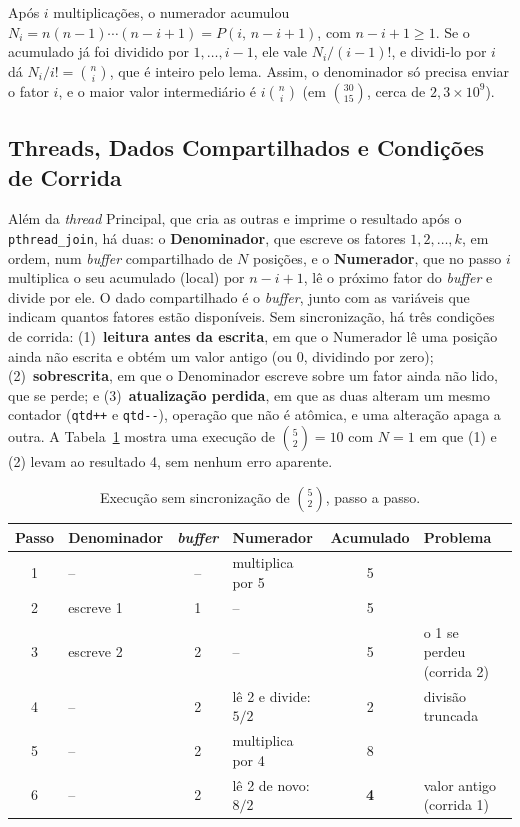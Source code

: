 \documentclass[a4paper, 12pt]{article}
\newcommand{\ok}[1]{\textcolor{green!45!black}{#1}}
\newcommand{\erro}[1]{\textcolor{red!70!black}{#1}}
\begin{document}
Após $i$ multiplicações, o numerador acumulou
$N_i = n(n-1)\cdots(n-i+1) = P(i,\,n-i+1)$, com $n-i+1 \ge 1$. Se o
acumulado já foi dividido por $1, \dots, i-1$, ele vale $N_i/(i-1)!$, e
dividi-lo por $i$ dá $N_i/i! = \binom{n}{i}$, que é inteiro pelo lema. Assim,
o denominador só precisa enviar o fator $i$, e o maior valor intermediário é
$i\binom{n}{i}$ (em $\binom{30}{15}$, cerca de $2{,}3 \times 10^{9}$).


\subsection{Threads, Dados Compartilhados e Condições de Corrida}

Além da \emph{thread} Principal, que cria as outras e imprime o resultado
após o \texttt{pthread\_join}, há duas: o \textbf{Denominador}, que escreve
os fatores $1, 2, \dots, k$, em ordem, num \emph{buffer} compartilhado de $N$
posições, e o \textbf{Numerador}, que no passo $i$ multiplica o seu acumulado
(local) por $n-i+1$, lê o próximo fator do \emph{buffer} e divide por ele. O
dado compartilhado é o \emph{buffer}, junto com as variáveis que indicam
quantos fatores estão disponíveis. Sem sincronização, há três condições de
corrida: (1)~\textbf{leitura antes da escrita}, em que o Numerador lê uma
posição ainda não escrita e obtém um valor antigo (ou 0, dividindo por
zero); (2)~\textbf{sobrescrita}, em que o Denominador escreve sobre um fator
ainda não lido, que se perde; e (3)~\textbf{atualização perdida}, em que as
duas alteram um mesmo contador (\texttt{qtd++} e \texttt{qtd-{}-}), operação
que não é atômica, e uma alteração apaga a outra. A
Tabela~\ref{tab:corrida} mostra uma execução de $\binom{5}{2} = 10$ com
$N = 1$ em que (1) e (2) levam ao resultado 4, sem nenhum erro aparente.

\begin{table}[H]
\centering
\caption{Execução sem sincronização de $\binom{5}{2}$, passo a passo.}
\label{tab:corrida}
\small
\begin{tabular}{clclcl}
\hline
Passo & Denominador & \emph{buffer} & Numerador & Acumulado & Problema \\
\hline
\ok{1}   & \ok{--}          & \ok{--}  & \ok{multiplica por 5}        & \ok{5}   & \\
\ok{2}   & \ok{escreve 1}   & \ok{1}   & \ok{--}                      & \ok{5}   & \\
\erro{3} & \erro{escreve 2} & \erro{2} & \erro{--}                    & \erro{5} & \erro{o 1 se perdeu (corrida 2)} \\
\erro{4} & \erro{--}        & \erro{2} & \erro{lê 2 e divide: $5/2$}  & \erro{2} & \erro{divisão truncada} \\
\ok{5}   & \ok{--}          & \ok{2}   & \ok{multiplica por 4}        & \ok{8}   & \\
\erro{6} & \erro{--}        & \erro{2} & \erro{lê 2 de novo: $8/2$}   & \erro{\textbf{4}} & \erro{valor antigo (corrida 1)} \\
\hline
\end{tabular}
\end{table}
\end{document}
